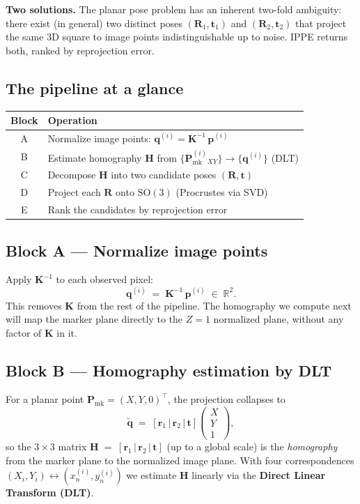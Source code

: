 \documentclass[11pt]{article}
\newcommand{\R}{\mathbb{R}}
\newcommand{\SO}[1]{\mathrm{SO}(#1)}
\newcommand{\Pmark}{\mathbf{P}_{\text{mk}}}
\newcommand{\KK}{\mathbf{K}}
\newcommand{\Hom}{\mathbf{H}}
\begin{document}
\textbf{Two solutions.} The planar pose problem has an inherent
two-fold ambiguity: there exist (in general) two distinct poses
$(\mathbf{R}_1, \mathbf{t}_1)$ and $(\mathbf{R}_2, \mathbf{t}_2)$ that project the same 3D
square to image points indistinguishable up to noise. IPPE returns both,
ranked by reprojection error.

\subsection{The pipeline at a glance}

\begin{center}
\begin{tabular}{|c|l|}
\hline
\textbf{Block} & \textbf{Operation} \\
\hline
A & Normalize image points: $\mathbf{q}^{(i)} = \KK^{-1}\,\mathbf{p}^{(i)}$ \\
B & Estimate homography $\Hom$ from $\{\Pmark^{(i)}_{XY}\} \to \{\mathbf{q}^{(i)}\}$ (DLT) \\
C & Decompose $\Hom$ into two candidate poses $(\mathbf{R}, \mathbf{t})$ \\
D & Project each $\mathbf{R}$ onto $\SO{3}$ (Procrustes via SVD) \\
E & Rank the candidates by reprojection error \\
\hline
\end{tabular}
\end{center}

\subsection{Block A --- Normalize image points}

Apply $\KK^{-1}$ to each observed pixel:
\begin{equation}
  \mathbf{q}^{(i)} \;=\; \KK^{-1}\,\mathbf{p}^{(i)} \;\in\; \R^2.
\end{equation}
This removes $\KK$ from the rest of the pipeline. The homography we
compute next will map the marker plane directly to the $Z = 1$ normalized
plane, without any factor of $\KK$ in it.

\subsection{Block B --- Homography estimation by DLT}

For a planar point $\Pmark = (X, Y, 0)^\top$, the projection collapses to
\begin{equation}
  \tilde{\mathbf{q}} \;=\; [\mathbf{r}_1 \,|\, \mathbf{r}_2 \,|\, \mathbf{t}]
  \begin{pmatrix} X \\ Y \\ 1 \end{pmatrix},
\end{equation}
so the $3\times 3$ matrix $\Hom \;=\; [\mathbf{r}_1\,|\,\mathbf{r}_2\,|\,\mathbf{t}]$
(up to a global scale) is the \emph{homography} from the marker plane to
the normalized image plane. With four correspondences
$(X_i, Y_i) \leftrightarrow (x_n^{(i)}, y_n^{(i)})$ we estimate $\Hom$
linearly via the \textbf{Direct Linear Transform (DLT)}.
\end{document}
